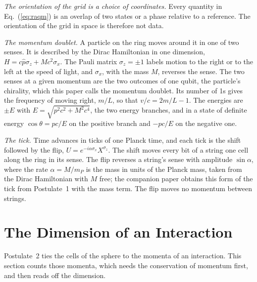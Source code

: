 \documentclass[aps,prd,twocolumn,superscriptaddress,nofootinbib]{revtex4-2}
\begin{document}
\textit{The orientation of the grid is a choice of coordinates.} Every quantity in Eq.~(\ref{eq:raqm}) is an overlap of two states or a phase relative to a reference. The orientation of the grid in space is therefore not data.

\textit{The momentum doublet.} A particle on the ring moves around it in one of two senses. It is described by the Dirac Hamiltonian in one dimension, $H = c\hat p\sigma_z + Mc^2\sigma_x$. The Pauli matrix $\sigma_z = \pm1$ labels motion to the right or to the left at the speed of light, and $\sigma_x$, with the mass $M$, reverses the sense. The two senses at a given momentum are the two outcomes of one qubit, the particle's chirality, which this paper calls the momentum doublet. Its number of 1s gives the frequency of moving right, $m/L$, so that $v/c = 2m/L - 1$. The energies are $\pm E$ with $E = \sqrt{p^2c^2 + M^2c^4}$, the two energy branches, and in a state of definite energy $\cos\theta = pc/E$ on the positive branch and $-pc/E$ on the negative one.

\textit{The tick.} Time advances in ticks of one Planck time, and each tick is the shift followed by the flip, $U = e^{-i\alpha\sigma_x}X^{\sigma_z}$. The shift moves every bit of a string one cell along the ring in its sense. The flip reverses a string's sense with amplitude $\sin\alpha$, where the rate $\alpha = M/m_P$ is the mass in units of the Planck mass, taken from the Dirac Hamiltonian with $M$ free; the companion paper obtains this form of the tick from Postulate~1 with the mass term. The flip moves no momentum between strings.

\section{The Dimension of an Interaction}
\label{sec:vertex}

Postulate~2 ties the cells of the sphere to the momenta of an interaction. This section counts those momenta, which needs the conservation of momentum first, and then reads off the dimension.
\end{document}
